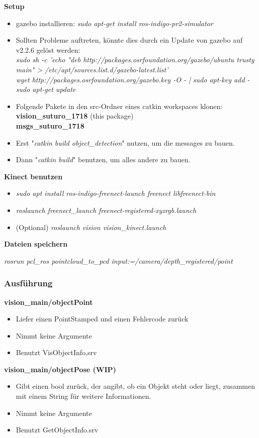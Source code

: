 \documentclass{suturo}
\begin{document}
\textbf{Setup}

\begin{itemize}
\item gazebo installieren: \textit{sudo apt-get install ros-indigo-pr2-simulator}

\item Sollten Probleme auftreten, könnte dies durch ein Update von gazebo auf v2.2.6 gelöst werden:
\\
\textit{sudo sh -c 'echo "deb http://packages.osrfoundation.org/gazebo/ubuntu trusty main" > /etc/apt/sources.list.d/gazebo-latest.list'}
\\
\textit{wget http://packages.osrfoundation.org/gazebo.key -O - | sudo apt-key add -}
\\
\textit{sudo apt-get update}

\item Folgende Pakete in den src-Ordner eines catkin workspaces klonen:\\
        \textbf{vision\_suturo\_1718} (this package) \\
        \textbf{msgs\_suturo\_1718}
\item Erst "\textit{catkin build object\_detection}" nutzen, um die messages zu bauen.
\item Dann "\textit{catkin build}" benutzen, um alles andere zu bauen.

\end{itemize}

\textbf{Kinect benutzen}
\begin{itemize}
\item \textit{sudo apt install ros-indigo-freenect-launch freenect libfreenect-bin}
\item \textit{roslaunch freenect\_launch freenect-registered-xyzrgb.launch}
\item (Optional) \textit{roslaunch vision vision\_kinect.launch}
\end{itemize}

\textbf{Dateien speichern}

    \textit{rosrun pcl\_ros pointcloud\_to\_pcd input:=/camera/depth\_registered/point}


\subsubsection{Ausf\"uhrung}

\textbf{vision\_main/objectPoint}
\begin{itemize}
\item Liefer einen PointStamped und einen Fehlercode zurück
\item Nimmt keine Argumente
\item Benutzt VisObjectInfo.srv
\end{itemize}
\textbf{vision\_main/objectPose (WIP)}
\begin{itemize}
\item Gibt einen bool zur\"uck, der angibt, ob ein Objekt steht oder liegt, zusammen mit einem String f\"ur weitere Informationen.
\item Nimmt keine Argumente
\item Benutzt GetObjectInfo.srv 
\end{itemize}
\end{document}
